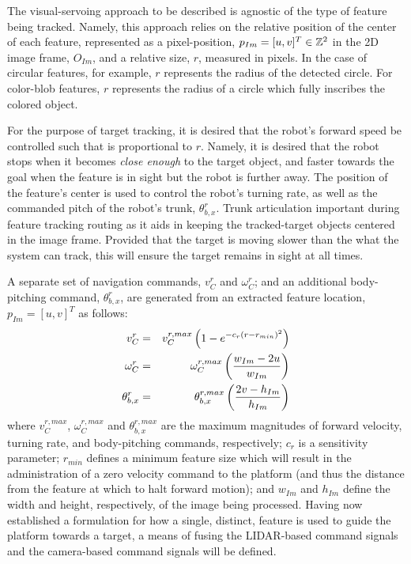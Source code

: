 			The visual-servoing approach to be described is agnostic of the type of feature being tracked. Namely, this approach relies on the relative position of the center of each feature, represented as a pixel-position, $p_{Im} = [u,v]^{T} \in {\Bbb Z}^{2}$ in the 2D image frame, $O_{Im}$, and a relative size, $r$, measured in pixels. In the case of circular features, for example, $r$ represents the radius of the detected circle. For color-blob features, $r$ represents the radius of a circle which fully inscribes the colored object.

			For the purpose of target tracking, it is desired that the robot's forward speed be controlled such that is proportional to $r$. Namely, it is desired that the robot stops when it becomes \emph{close enough} to the target object, and faster towards the goal when the feature is in sight but the robot is further away. The position of the feature's center is used to control the robot's turning rate, as well as the commanded pitch of the robot's trunk, $\theta_{b,x}^{r}$. Trunk articulation important during feature tracking routing as it aids in keeping the tracked-target objects centered in the image frame. Provided that the target is moving slower than the what the system can track, this will ensure the target remains in sight at all times.

			A separate set of navigation commands, $v_{C}^{r}$ and $\omega_{C}^{r}$; and an additional body-pitching command, $\theta_{b,x}^{r}$,  are generated from an extracted feature location, $p_{Im} = [u,v]^{T}$ as follows: 
				\begin{eqnarray}
					v_{C}^{r} 			& = & v_{C}^{r,max} \left( 1 - e^{ -c_{r} \left( r-r_{min} \right)^{2} } \right) 	\nonumber 	\\
					\omega_{C}^{r} 	& = & \omega_{C}^{r,max} \left(\frac{ w_{Im} - 2 u  }{ w_{Im} } \right)		\nonumber 	\\
					\theta_{b,x}^{r}	& = & \theta_{b,x}^{r,max} \left( \frac{ 2 v - h_{Im} }{ h_{Im} } \right) 		
				\end{eqnarray}
			where $v_{C}^{r,max}$, $\omega_{C}^{r,max}$ and $\theta_{b,x}^{r,max}$ are the maximum magnitudes of forward velocity, turning rate, and body-pitching commands, respectively; $c_{r}$ is a sensitivity parameter; $r_{min}$ defines a minimum feature size which will result in the administration of a zero velocity command to the platform (and thus the distance from the feature at which to halt forward motion); and $w_{Im}$ and $h_{Im}$ define the width and height, respectively, of the image being processed. Having now established a formulation for how a single, distinct, feature is used to guide the platform towards a target, a means of fusing the LIDAR-based command signals and the camera-based command signals will be defined.

